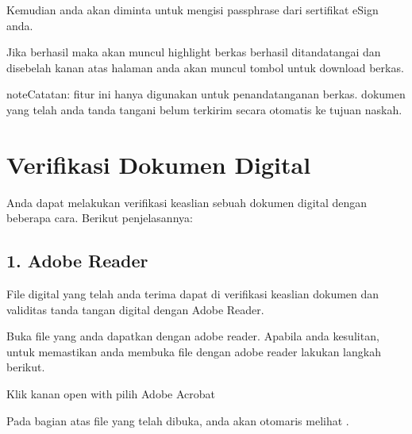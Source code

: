 \documentclass[letterpaper,10pt,bahasai]{sphinxmanual}
\begin{document}
\noindent{}

Kemudian anda akan diminta untuk mengisi passphrase dari sertifikat eSign anda.

\noindent{}

Jika berhasil maka akan muncul highlight berkas berhasil ditandatangai dan disebelah kanan atas halaman anda akan
muncul tombol untuk download berkas.

\noindent{}

\begin{sphinxadmonition}{note}{Catatan:}
fitur ini hanya digunakan untuk penandatanganan berkas. dokumen yang telah anda tanda tangani belum terkirim secara otomatis ke tujuan naskah.
\end{sphinxadmonition}


\chapter{Verifikasi Dokumen Digital}
\label{\detokenize{verifikasi:verifikasi-dokumen-digital}}\label{\detokenize{verifikasi::doc}}
Anda dapat melakukan verifikasi keaslian sebuah dokumen digital dengan beberapa cara. Berikut penjelasannya:


\section{1. Adobe Reader}
\label{\detokenize{verifikasi:adobe-reader}}
File digital yang telah anda terima dapat di verifikasi keaslian dokumen dan validitas tanda tangan digital dengan Adobe Reader.

Buka file yang anda dapatkan dengan adobe reader. Apabila anda kesulitan, untuk memastikan anda membuka file
dengan adobe reader lakukan langkah berikut.

\begin{DUlineblock}{0em}
\item[] Klik kanan \sphinxstylestrong{\sphinxhyphen{}\textgreater{}} open with \sphinxstylestrong{\sphinxhyphen{}\textgreater{}} pilih Adobe Acrobat
\end{DUlineblock}

\noindent{}

Pada bagian atas file yang telah dibuka, anda akan otomaris melihat .

\noindent{}
\end{document}
